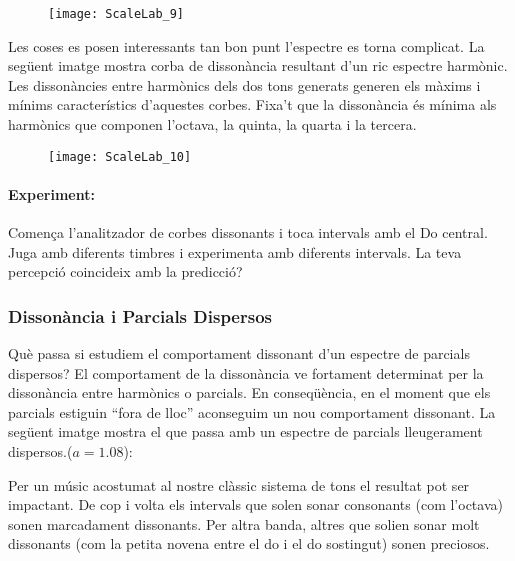\begin{figure}[h]
\centering
\texttt{[image: ScaleLab\_9]}
\end{figure}

Les coses es posen interessants tan bon punt l'espectre es torna complicat. La següent imatge mostra corba de dissonància resultant d'un ric espectre harmònic. Les dissonàncies entre harmònics dels dos tons generats generen els màxims i mínims característics d'aquestes corbes. Fixa't que la dissonància és mínima als harmònics que componen l'octava, la quinta, la quarta i la tercera.

\begin{figure}[h]
\centering
\texttt{[image: ScaleLab\_10]}
\end{figure}

\paragraph{Experiment:}
Comença l'analitzador de corbes dissonants i toca intervals amb el Do central. Juga amb diferents timbres i experimenta amb diferents intervals. La teva percepció coincideix amb la predicció?

\subsubsection{Dissonància i Parcials Dispersos}
Què passa si estudiem el comportament dissonant d'un espectre de parcials dispersos? El comportament de la dissonància ve fortament determinat per la dissonància entre harmònics o parcials. En conseqüència, en el moment que els parcials estiguin ``fora de lloc'' aconseguim un nou comportament dissonant.
La següent imatge mostra el que passa amb un espectre de parcials lleugerament dispersos.($a=1.08$):

\begin{figure}[h]
\centering
{}
\end{figure}

Per un músic acostumat al nostre clàssic sistema de tons el resultat pot ser impactant. De cop i volta els intervals que solen sonar consonants (com l'octava) sonen marcadament dissonants. Per altra banda, altres que solien sonar molt dissonants (com la petita novena entre el do i el do sostingut) sonen preciosos.

